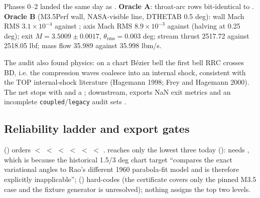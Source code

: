 Phases 0--2 landed the same day as . \textbf{Oracle A}: throat-arc rows bit-identical to
. \textbf{Oracle B} (M3.5Perf wall, NASA-visible line, DTHETAB 0.5 deg): wall Mach RMS
$3.1\times10^{-4}$ against ; axis Mach RMS $8.9\times10^{-3}$ against  (halving
at 0.25 deg); exit $M = 3.5009\pm0.0017$, $\theta_{\text{rms}} = 0.003$ deg; stream thrust 2517.72 against 2518.05
lbf; mass flow 35.989 against 35.998 lbm/s.

The audit also found physics: on a chart B\'ezier bell the first bell RRC crosses BD, i.e. the compression waves
coalesce into an internal shock, consistent with the TOP internal-shock literature (Hagemann 1998; Frey and
Hagemann 2000). The net stops with  and a ; downstream,
 exports NaN exit metrics and an incomplete \texttt{coupled}/\texttt{legacy} audit sets
.


\subsection{Reliability ladder and export gates}

 () orders  $<$
 $<$  $<$  $<$
 $<$  $<$ . 
reaches only the lowest three today ():  needs
, which is  because the historical 1.5/3 deg chart target
``compares the exact variational angles to Rao's different 1960 parabola-fit model and is therefore explicitly
inapplicable'';  () hard-codes 
(the certificate covers only the pinned M3.5 case and the fixture generator is unresolved); nothing assigns the
top two levels.

